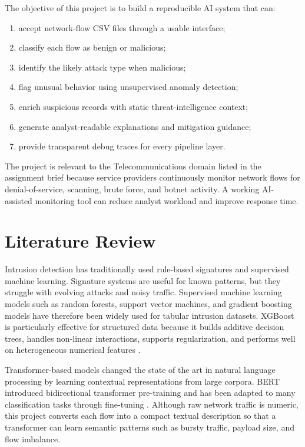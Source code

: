 \documentclass[12pt,a4paper]{article}
\begin{document}
The objective of this project is to build a reproducible AI system that can:

\begin{enumerate}[leftmargin=1.2cm]
    \item accept network-flow CSV files through a usable interface;
    \item classify each flow as benign or malicious;
    \item identify the likely attack type when malicious;
    \item flag unusual behavior using unsupervised anomaly detection;
    \item enrich suspicious records with static threat-intelligence context;
    \item generate analyst-readable explanations and mitigation guidance;
    \item provide transparent debug traces for every pipeline layer.
\end{enumerate}

The project is relevant to the Telecommunications domain listed in the assignment brief because service providers continuously monitor network flows for denial-of-service, scanning, brute force, and botnet activity. A working AI-assisted monitoring tool can reduce analyst workload and improve response time.

\section{Literature Review}

Intrusion detection has traditionally used rule-based signatures and supervised machine learning. Signature systems are useful for known patterns, but they struggle with evolving attacks and noisy traffic. Supervised machine learning models such as random forests, support vector machines, and gradient boosting models have therefore been widely used for tabular intrusion datasets. XGBoost is particularly effective for structured data because it builds additive decision trees, handles non-linear interactions, supports regularization, and performs well on heterogeneous numerical features \cite{xgboost}.

Transformer-based models changed the state of the art in natural language processing by learning contextual representations from large corpora. BERT introduced bidirectional transformer pre-training and has been adapted to many classification tasks through fine-tuning \cite{bert}. Although raw network traffic is numeric, this project converts each flow into a compact textual description so that a transformer can learn semantic patterns such as bursty traffic, payload size, and flow imbalance.
\end{document}
